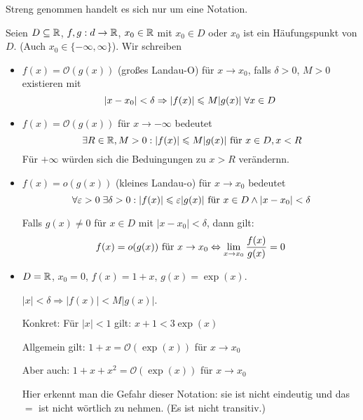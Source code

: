 \documentclass[main.tex]{subfiles}
\begin{document}
Streng genommen handelt es sich nur um eine Notation.
\begin{Definition}
  Seien $D \subseteq \mathbb{R}$, $f,g :d \to \mathbb{R}$, $x_0 \in \mathbb{R}$ mit $x_0 \in D$ oder $x_0$ ist ein Häufungspunkt von $D$. (Auch $x_0 \in \{-\infty,\infty\}$). Wir schreiben
  \begin{itemize}
    \item $f(x) = \mathcal{O}(g(x))$ (großes Landau-O) für $x \to x_0$, falls $\delta >0$, $M > 0$ existieren mit
      $$|x - x_0| < \delta \Rightarrow |f(x)| \leqslant M |g(x)| \;\forall x \in D$$
    \item $f(x) = \mathcal{O}(g(x))$ für $x \to -\infty$ bedeutet
      $$\;\exists R \in \mathbb{R},M > 0 : |f(x)| \leqslant M |g(x)| \text{ für } x \in D, x < R$$
      Für $+\infty$ würden sich die Beduingungen zu $x > R$ verändernn.
    \item $f(x) = o(g(x))$ (kleines Landau-o) für $x \to x_0$ bedeutet
      $$\;\forall \varepsilon > 0 \;\exists \delta > 0 : |f(x)| \leqslant \varepsilon |g(x)| \text{ für } x\in D \land |x - x_0| < \delta$$
      \begin{Theorem}
        Falls $g(x) \neq 0$ für $x \in D$ mit $|x - x_0| < \delta$, dann gilt:
        $$f(x) = o(g(x)) \text{ für } x \to x_0 \Leftrightarrow \lim \limits_{x \to x_0} \dfrac{f(x)}{g(x)} = 0$$
      \end{Theorem}
  \end{itemize}
\end{Definition}

\begin{Beispiel}
  \begin{itemize}
    \item $D = \mathbb{R}$, $x_0 = 0$, $f(x) = 1+x$, $g(x) = \exp(x)$.
    
    $|x| < \delta \Rightarrow |f(x)| < M |g(x)|$.
    
    Konkret: Für $|x| < 1$ gilt: $x+1 < 3 \exp(x)$
    
    Allgemein gilt: $1 + x = \mathcal{O}(\exp(x))$ für $x \to x_0$
    
    Aber auch: $1 + x + x^2= \mathcal{O}(\exp(x))$ für $x \to x_0$
    
    \begin{Bemerkung}
      Hier erkennt man die Gefahr dieser Notation: sie ist nicht eindeutig und das $=$ ist nicht wörtlich zu nehmen. (Es ist nicht transitiv.)
    \end{Bemerkung}
  \end{itemize}
\end{Beispiel}
\end{document}
